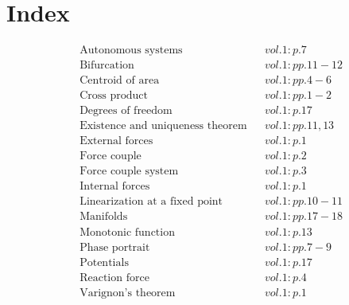 \documentclass[a4paper]{article}
\begin{document}
 
\section*{Index} 
\begin{align*} 
&\text{Autonomous systems}&& vol. 1: p. 7\\
&\text{Bifurcation}&& vol. 1: pp. 11-12\\
&\text{Centroid of area}&& vol. 1: pp. 4-6\\
&\text{Cross product}&& vol. 1: pp. 1-2\\
&\text{Degrees of freedom}&& vol. 1: p. 17\\
&\text{Existence and uniqueness theorem}&& vol. 1: pp. 11, 13\\
&\text{External forces}&& vol. 1: p. 1\\
&\text{Force couple}&& vol. 1: p. 2\\
&\text{Force couple system}&& vol. 1: p. 3\\
&\text{Internal forces}&& vol. 1: p. 1\\
&\text{Linearization at a fixed point}&& vol. 1: pp. 10-11\\
&\text{Manifolds}&& vol. 1: pp. 17-18\\
&\text{Monotonic function}&& vol. 1: p. 13\\
&\text{Phase portrait}&& vol. 1: pp. 7-9\\
&\text{Potentials}&& vol. 1: p. 17\\
&\text{Reaction force}&& vol. 1: p. 4\\
&\text{Varignon's theorem}&& vol. 1: p. 1\\
\end{align*} 
\end{document}

